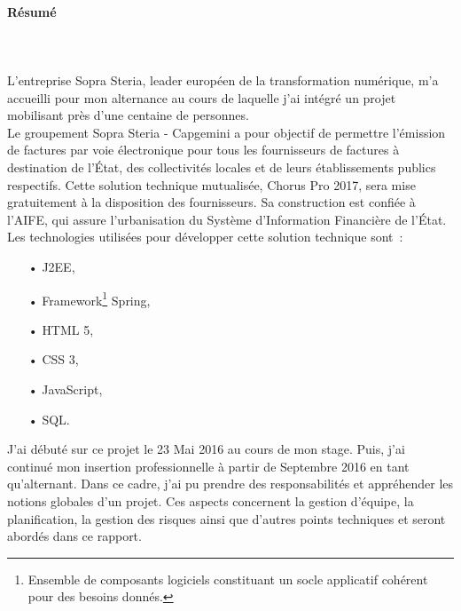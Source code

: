 \documentclass[12pt,a4paper]{article}
\begin{document}
\paragraph{Résumé}
~~\\\\
L'entreprise Sopra Steria, leader européen de la transformation numérique, m'a accueilli pour mon alternance au cours de laquelle j'ai intégré un projet mobilisant près d'une centaine de personnes.\\
Le groupement Sopra Steria - Capgemini a pour objectif de permettre l’émission de factures par voie électronique pour tous les fournisseurs de factures à destination de l’État, des collectivités locales et de leurs établissements publics respectifs.
Cette solution technique mutualisée, Chorus Pro 2017, sera mise gratuitement à la disposition des fournisseurs. Sa construction est confiée à l'\gls{AIFE}, qui assure l’urbanisation du Système d’Information Financière de l’État.
Les technologies utilisées pour développer cette solution technique sont~:
\smallbreak
\begin{itemize}
\item[•] \gls{J2EE},
\item[•] Framework\footnote{Ensemble de composants logiciels constituant un socle applicatif cohérent pour des besoins donnés.} Spring,
\item[•] \gls{HTML} 5,
\item[•] \gls{CSS} 3,
\item[•] JavaScript,
\item[•] \gls{SQL}.
\end{itemize}
\medbreak
J'ai débuté sur ce projet le 23 Mai 2016 au cours de mon stage. Puis, j’ai continué mon insertion professionnelle à partir de Septembre 2016 en tant qu'alternant.
\smallbreak
Dans ce cadre, j'ai pu prendre des responsabilités et appréhender les notions globales d’un projet. Ces aspects concernent la gestion d’équipe, la planification, la gestion des risques ainsi que
d’autres points techniques et seront abordés dans ce rapport.
\newpage
\end{document}
